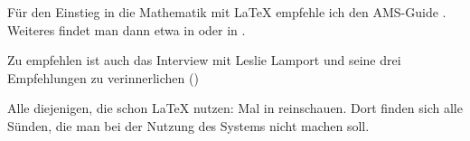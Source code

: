 \begin{myenumerate}
	\item
	Für den Einstieg in die Mathematik mit \LaTeX{} empfehle ich den AMS-Guide \cite{short-math-guide}.
	Weiteres findet man dann etwa in \textcite{graetzer:2007} oder in \textcite{voss:2012b}.	
	
	\item
	Zu empfehlen ist auch das Interview mit Leslie Lamport und seine drei Empfehlungen zu verinnerlichen (\cite{lamport:dmv})
	
	\item
	Alle diejenigen, die schon \LaTeX{} nutzen: Mal in \textcite{l2tabu} reinschauen.
	Dort finden sich alle Sünden, die man bei der Nutzung des Systems nicht machen soll.
	
		
\end{myenumerate}